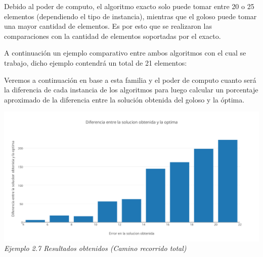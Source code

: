 Debido al poder de computo, el algoritmo exacto solo puede tomar entre 20 o 25 elementos (dependiendo el tipo de instancia), mientras que el goloso puede tomar una mayor cantidad de elementos. Es por esto que se realizaron las comparaciones con la cantidad de elementos soportadas por el exacto.

A continuaci\'on un ejemplo comparativo entre ambos algoritmos con el cual se trabajo, dicho ejemplo contendr\'a un total de 21 elementos:



\begin{figure} [!ht]
 \centering
       \label{fig:jaggies}
    \label{fig:moire}
    \end{figure}



Veremos a continuaci\'on en base a esta familia y el poder de computo cuanto ser\'a la diferencia de cada instancia de los algoritmos para luego calcular un porcentaje aproximado de la diferencia entre la soluci\'on obtenida del goloso y la \'optima.

\vspace*{0.3cm} \vspace*{0.3cm}
  \begin{center}
\includegraphics[scale=0.5]{./EJ2/algungym0.png}
\\{\textit{Ejemplo 2.7 Resultados obtenidos (Camino recorrido total) }}
  \end{center}
  \vspace*{0.3cm}


